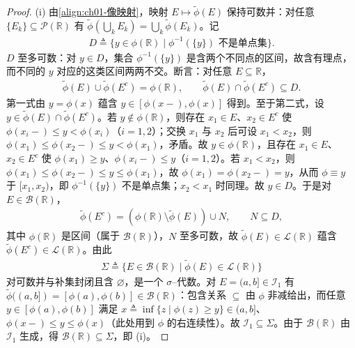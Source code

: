 \documentclass[../../main.tex]{subfiles}%
\begin{document}
\begin{proof}
(i) 由\eqref{align:ch01-像映射}，映射 $E\mapsto\widetilde{\phi}(E)$ 保持可数并：对任意 $\{E_k\}\subseteq\mathcal{P}(\mathbb{R})$ 有 $\widetilde{\phi}\left(\bigcup_kE_k\right)=\bigcup_k\widetilde{\phi}(E_k)$。记
\begin{align*}
D\triangleq\{y\in\phi(\mathbb{R})\mid\phi^{-1}(\{y\})\text{ 不是单点集}\}.
\end{align*}
$D$ 至多可数：对 $y\in D$，集合 $\phi^{-1}(\{y\})$ 是含两个不同点的区间，故含有理点，而不同的 $y$ 对应的这类区间两两不交。断言：对任意 $E\subseteq\mathbb{R}$，
\begin{align*}
\widetilde{\phi}(E)\cup\widetilde{\phi}(E^c)=\phi(\mathbb{R}),\qquad
\widetilde{\phi}(E)\cap\widetilde{\phi}(E^c)\subseteq D.
\end{align*}
第一式由 $y=\phi(x)$ 蕴含 $y\in[\phi(x-),\phi(x)]$ 得到。至于第二式，设 $y\in\widetilde{\phi}(E)\cap\widetilde{\phi}(E^c)$。若 $y\notin\phi(\mathbb{R})$，则存在 $x_1\in E$、$x_2\in E^c$ 使 $\phi(x_i-)\leqslant y<\phi(x_i)$（$i=1,2$）；交换 $x_1$ 与 $x_2$ 后可设 $x_1<x_2$，则 $\phi(x_1)\leqslant\phi(x_2-)\leqslant y<\phi(x_1)$，矛盾。故 $y\in\phi(\mathbb{R})$，且存在 $x_1\in E$、$x_2\in E^c$ 使 $\phi(x_1)\geqslant y$、$\phi(x_i-)\leqslant y$（$i=1,2$）。若 $x_1<x_2$，则 $\phi(x_1)\leqslant\phi(x_2-)\leqslant y\leqslant\phi(x_1)$，故 $\phi(x_1)=\phi(x_2-)=y$，从而 $\phi\equiv y$ 于 $[x_1,x_2)$，即 $\phi^{-1}(\{y\})$ 不是单点集；$x_2<x_1$ 时同理。故 $y\in D$。于是对 $E\in\mathcal{B}(\mathbb{R})$，
\begin{align*}
\widetilde{\phi}(E^c)=\left(\phi(\mathbb{R})\setminus\widetilde{\phi}(E)\right)\cup N,\qquad N\subseteq D,
\end{align*}
其中 $\phi(\mathbb{R})$ 是区间（属于 $\mathcal{B}(\mathbb{R})$），$N$ 至多可数，故 $\widetilde{\phi}(E)\in\mathcal{L}(\mathbb{R})$ 蕴含 $\widetilde{\phi}(E^c)\in\mathcal{L}(\mathbb{R})$。由此
\begin{align*}
\Sigma\triangleq\{E\in\mathcal{B}(\mathbb{R})\mid\widetilde{\phi}(E)\in\mathcal{L}(\mathbb{R})\}
\end{align*}
对可数并与补集封闭且含 $\varnothing$，是一个 $\sigma$--代数。对 $E=(a,b]\in\mathcal{I}_1$ 有 $\widetilde{\phi}((a,b])=[\phi(a),\phi(b)]\in\mathcal{B}(\mathbb{R})$：包含关系 $\subseteq$ 由 $\phi$ 非减给出，而任意 $y\in[\phi(a),\phi(b)]$ 满足 $x\triangleq\inf\{z\mid\phi(z)\geqslant y\}\in(a,b]$、$\phi(x-)\leqslant y\leqslant\phi(x)$（此处用到 $\phi$ 的右连续性）。故 $\mathcal{I}_1\subseteq\Sigma$。由于 $\mathcal{B}(\mathbb{R})$ 由 $\mathcal{I}_1$ 生成，得 $\mathcal{B}(\mathbb{R})\subseteq\Sigma$，即 (i)。


\end{proof}
\end{document}
